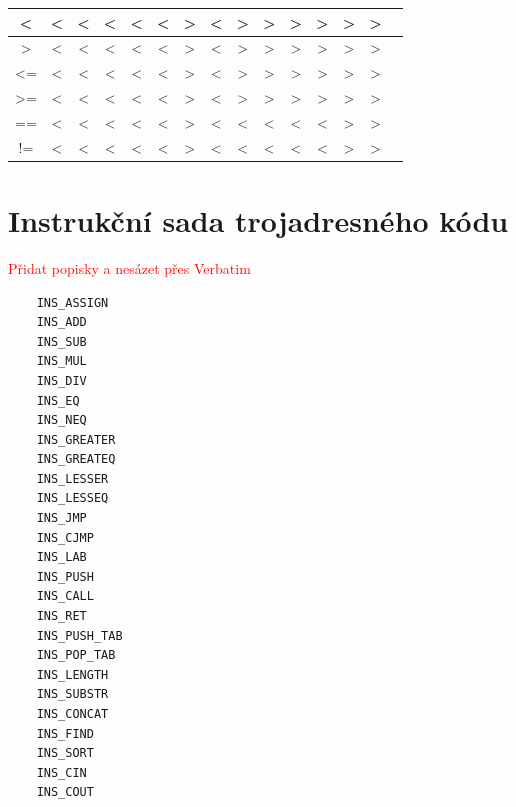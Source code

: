 \documentclass[a4paper, 12pt]{article}
\begin{document}
\begin{center}
\begin{tabular}{|c||c|c|c|c|c|c|c|c|c|c|c|c|c|c|}
\textless     & \textless & \textless & \textless & \textless & \textless & \textgreater & \textless & \textgreater        & \textgreater           & \textgreater         & \textgreater            & \textgreater & \textgreater & \\ \hline
\textgreater  & \textless & \textless & \textless & \textless & \textless & \textgreater & \textless & \textgreater        & \textgreater           & \textgreater         & \textgreater            & \textgreater & \textgreater & \\ \hline
\textless=    & \textless & \textless & \textless & \textless & \textless & \textgreater & \textless & \textgreater        & \textgreater           & \textgreater         & \textgreater            & \textgreater & \textgreater & \\ \hline
\textgreater= & \textless & \textless & \textless & \textless & \textless & \textgreater & \textless & \textgreater        & \textgreater           & \textgreater         & \textgreater            & \textgreater & \textgreater & \\ \hline
==            & \textless & \textless & \textless & \textless & \textless & \textgreater & \textless & \textless        & \textless           & \textless         & \textless            & \textgreater & \textgreater & \\ \hline
!=            & \textless & \textless & \textless & \textless & \textless & \textgreater & \textless & \textless        & \textless           & \textless         & \textless            & \textgreater & \textgreater & \\ \hline
\end{tabular}
\end{center}

\newpage

\section{Instrukční sada trojadresného kódu} \label{instrukce}
\textcolor{red}{Přidat popisky a nesázet přes Verbatim}
\begin{verbatim}
    INS_ASSIGN
    INS_ADD
    INS_SUB
    INS_MUL
    INS_DIV
    INS_EQ
    INS_NEQ
    INS_GREATER
    INS_GREATEQ
    INS_LESSER
    INS_LESSEQ
    INS_JMP
    INS_CJMP
    INS_LAB
    INS_PUSH
    INS_CALL
    INS_RET
    INS_PUSH_TAB
    INS_POP_TAB
    INS_LENGTH
    INS_SUBSTR
    INS_CONCAT
    INS_FIND
    INS_SORT
    INS_CIN
    INS_COUT
\end{verbatim}
\end{document}
